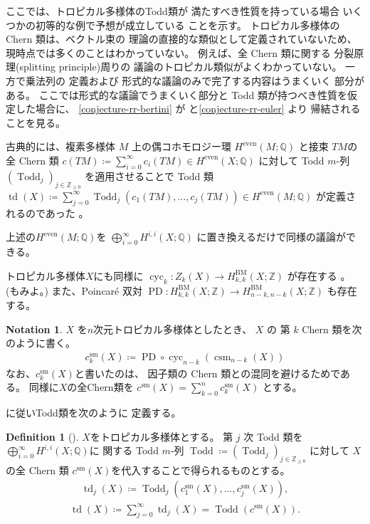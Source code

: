 \documentclass[a4paper,dvipdfmx,reqno,12pt]{amsart}
\theoremstyle{definition}
\newtheorem{definition}[theorem]{Definition}
\newtheorem{notation}[theorem]{Notation}
\newcommand{\deq}{\coloneqq}
\newcommand{\opn}[1]{\operatorname{#1}}
\numberwithin{equation}{section}
\begin{document}
ここでは、トロピカル多様体のTodd類が
満たすべき性質を持っている場合
いくつかの初等的な例で予想が成立している
ことを示す。
トロピカル多様体の Chern 類は、ベクトル束の
理論の直接的な類似として定義されていないため、
現時点では多くのことはわかっていない。
例えば、全 Chern 類に関する
分裂原理(splitting principle)周りの
議論のトロピカル類似がよくわかっていない。
一方で乗法列\cite[]{MR1335917}の
定義および
形式的な議論のみで完了する内容はうまくいく
部分がある。
ここでは形式的な議論でうまくいく部分と
Todd 類が持つべき性質を仮定した場合に、
\cref{conjecture-rr-bertini} 
が\cite[Conjecture 6.13]{demedrano2023chern}
と\cref{conjecture-rr-euler} より
帰結されることを見る。

古典的には、複素多様体 $M$ 上の偶コホモロジー環
$H^{\mathrm{even}}(M;\mathbb{Q})$
と接束 $TM$の全 Chern 類 
$c(TM)\deq \sum_{i=0}^{\infty}c_i(TM)\in 
H^{\mathrm{even}}(X;\mathbb{Q})$
に対して
Todd $m$-列 $(\opn{Todd}_j)_{j\in \mathbb{Z}_{\geq 0}}$
を適用させることで Todd 類
$\opn{td}(X)\deq \sum_{j=0}^{\infty}
\opn{Todd}_j(c_1(TM),\ldots,c_j(TM))\in 
H^{\mathrm{even}}(M;\mathbb{Q})$
が定義されるのであった
\cite[]{MR1335917}。

上述の$H^{\mathrm{even}}(M;\mathbb{Q})$を
$\bigoplus_{i=0}^{\infty} H^{i,i}(X;\mathbb{Q})$
に置き換えるだけで同様の議論ができる。

トロピカル多様体$X$にも同様に
$\opn{cyc}_k\colon Z_k(X)\to H^{\mathrm{BM}}_{k,k}(X;\mathbb{Z})$
が存在する
\cite{gross2019sheaftheoretic}。
(\cite[Definition 4.13]{MR3894860}もみよ。)
また、Poincar\'e 双対
$\opn{PD}\colon H_{k,k}^{\opn{BM}}(X;\mathbb{Z})
\to H_{n-k,n-k}^{\opn{BM}}(X;\mathbb{Z})$
も存在する。

\begin{notation}
$X$ を$n$次元トロピカル多様体としたとき、
$X$ の 第 $k$ Chern 類を次のように書く。 
\begin{align}
c_{k}^{\mathrm{sm}}(X)\deq
\opn{PD}\circ \opn{cyc}_{n-k}(\opn{csm}_{n-k}(X))
\end{align}
なお、$c_{k}^{\mathrm{sm}}(X)$と書いたのは、
因子類の Chern 類との混同を避けるためである。
同様に$X$の全Chern類を
$c^{\mathrm{sm}}(X)=\sum_{k=0}^{n} c_{k}^{\mathrm{sm}}(X)$
とする。
\end{notation}
\cite{demedrano2023chern}に従いTodd類を次のように
定義する。
\begin{definition}[{\cite{demedrano2023chern}}]
$X$をトロピカル多様体とする。
第 $j$ 次 Todd 類を
$\bigoplus_{i=0}^{\infty} H^{i,i}(X;\mathbb{Q})$に
関する Todd $m$-列 $\opn{Todd}\deq (\opn{Todd}_j)_{j\in \mathbb{Z}_{\geq 0}}$
に対して
$X$ の全 Chern 類
$c^{\mathrm{sm}}(X)$を代入することで得られるものとする。
\begin{align}
\opn{td}_j(X)\deq \opn{Todd}_j(c_{1}^{\mathrm{sm}}(X),
\ldots,c_{j}^{\mathrm{sm}}(X)),
\end{align}
\begin{align}
\opn{td}(X)\deq \sum_{j=0}^{\infty}\opn{td}_j(X)=
\opn{Todd}(c^{\mathrm{sm}}(X)).
\end{align}

\end{definition}
\end{document}
